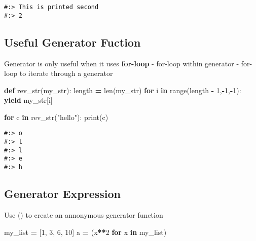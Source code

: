 \documentclass[
]{book}
\newenvironment{Shaded}{\begin{snugshade}}{\end{snugshade}}
\newcommand{\BuiltInTok}[1]{#1}
\newcommand{\ControlFlowTok}[1]{\textcolor[rgb]{0.27,0.27,0.27}{\textbf{#1}}}
\newcommand{\DecValTok}[1]{\textcolor[rgb]{0.06,0.06,0.06}{#1}}
\newcommand{\KeywordTok}[1]{\textcolor[rgb]{0.27,0.27,0.27}{\textbf{#1}}}
\newcommand{\NormalTok}[1]{#1}
\newcommand{\OperatorTok}[1]{\textcolor[rgb]{0.43,0.43,0.43}{\textbf{#1}}}
\newcommand{\StringTok}[1]{\textcolor[rgb]{0.5,0.5,0.5}{#1}}
\begin{document}
\begin{verbatim}
#:> This is printed second
#:> 2
\end{verbatim}

\hypertarget{useful-generator-fuction}{%
\subsection{Useful Generator Fuction}\label{useful-generator-fuction}}

Generator is only useful when it uses \textbf{for-loop} - for-loop within generator - for-loop to iterate through a generator

\begin{Shaded}
\begin{Highlighting}[]
\KeywordTok{def}\NormalTok{ rev\_str(my\_str):}
\NormalTok{    length }\OperatorTok{=} \BuiltInTok{len}\NormalTok{(my\_str)}
    \ControlFlowTok{for}\NormalTok{ i }\KeywordTok{in} \BuiltInTok{range}\NormalTok{(length }\OperatorTok{{-}} \DecValTok{1}\NormalTok{,}\OperatorTok{{-}}\DecValTok{1}\NormalTok{,}\OperatorTok{{-}}\DecValTok{1}\NormalTok{):}
        \ControlFlowTok{yield}\NormalTok{ my\_str[i]}
\end{Highlighting}
\end{Shaded}

\begin{Shaded}
\begin{Highlighting}[]
\ControlFlowTok{for}\NormalTok{ c }\KeywordTok{in}\NormalTok{ rev\_str(}\StringTok{"hello"}\NormalTok{):}
     \BuiltInTok{print}\NormalTok{(c)}
\end{Highlighting}
\end{Shaded}

\begin{verbatim}
#:> o
#:> l
#:> l
#:> e
#:> h
\end{verbatim}

\hypertarget{generator-expression}{%
\subsection{Generator Expression}\label{generator-expression}}

Use () to create an annonymous generator function

\begin{Shaded}
\begin{Highlighting}[]
\NormalTok{my\_list }\OperatorTok{=}\NormalTok{ [}\DecValTok{1}\NormalTok{, }\DecValTok{3}\NormalTok{, }\DecValTok{6}\NormalTok{, }\DecValTok{10}\NormalTok{]}
\NormalTok{a }\OperatorTok{=}\NormalTok{ (x}\OperatorTok{**}\DecValTok{2} \ControlFlowTok{for}\NormalTok{ x }\KeywordTok{in}\NormalTok{ my\_list)}
\end{Highlighting}
\end{Shaded}
\end{document}
